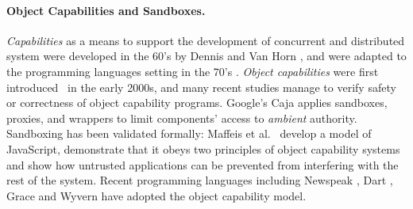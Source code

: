 \paragraph{Object Capabilities and Sandboxes.}
{{\em Capabilities} as a means to support the development of concurrent and distributed system  were developed in the 60's
by Dennis and Van Horn \cite{Dennis66}, and were adapted to the
programming languages setting in the 70's \cite{JamesMorris}. 
{\em Object capabilities} were first introduced~\cite{MillerPhD} in the early 2000s},
 and many recent %
studies manage
to verify  safety or correctness of object capability programs.
Google's Caja \cite{Caja} applies   sandboxes, proxies, and wrappers
 to limit components'
access to \textit{ambient} authority.
Sandboxing has been validated
formally: Maffeis et al.\ \cite{mmt-oakland10} develop a model of
JavaScript, demonstrate that it obeys two principles of
object capability systems
and show  how untrusted applications can be prevented from interfering with
the rest of the system. 
Recent programming languages %
\cite{CapJavaHayesAPLAS17,CapNetSocc17Eide,DOCaT14} including Newspeak
\cite{newspeak17}, Dart \cite{dart15}, Grace \cite{grace,graceClasses}
and Wyvern \cite{wyverncapabilities} have adopted the object
capability model.

  
